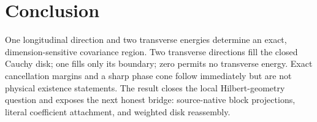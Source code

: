 \section{Conclusion}

One longitudinal direction and two transverse energies determine an exact,
dimension-sensitive covariance region.  Two transverse directions fill the
closed Cauchy disk; one fills only its boundary; zero permits no transverse
energy.  Exact cancellation margins and a sharp phase cone follow immediately
but are not physical existence statements.  The result closes the local
Hilbert-geometry question and exposes the next honest bridge: source-native
block projections, literal coefficient attachment, and weighted disk
reassembly.
